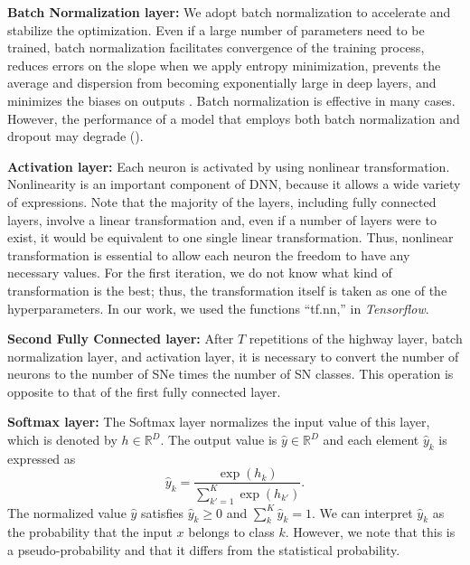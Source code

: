 \documentclass[useamsfonts]{pasj01}
\begin{document}
{\bf Batch Normalization layer:}
We adopt batch normalization \citep{batch_norm} to accelerate and stabilize the optimization. 
Even if a large number of parameters need to be trained, batch normalization facilitates convergence of the training process, reduces errors on the slope when we apply entropy minimization, prevents the average and dispersion from becoming exponentially large in deep layers, and minimizes the biases on outputs  \citep{understanding_batch_norm}.
Batch normalization is effective in many cases. 
However, the performance of a model that employs both batch normalization and dropout may degrade  (\cite{dropout_and_batch_norm}).   

{\bf Activation layer:}
Each neuron is activated by using nonlinear transformation. 
Nonlinearity is an important component of DNN, because it allows a wide variety of expressions. 
Note that the majority of the layers, including fully connected layers, involve a linear transformation and, even if a number of layers were to exist, it would be equivalent to one single linear transformation. 
Thus, nonlinear transformation is essential to allow each neuron the freedom to have any necessary values.
For the first iteration, we do not know what kind of transformation is the best; thus, the transformation itself is taken as one of the hyperparameters. 
In our work, we used the functions ``tf.nn,'' in {\it Tensorflow}.

{\bf Second Fully Connected layer:}
After $T$ repetitions of the highway layer, batch normalization layer, and activation layer, it is necessary to convert the number of neurons to the number of SNe times the number of SN classes. 
This operation is opposite to that of the first fully connected layer.

{\bf Softmax layer:}
The Softmax layer normalizes the input value of this layer, which is denoted by $h \in \mathbb{R}^D$. The output value is $\hat{y} \in \mathbb{R}^D$ and each element $\hat{y}_k$ is expressed as
\begin{equation}
    \hat{y}_k = \frac{\exp \left( h_k \right)}{\sum_{k'=1}^K \exp \left( h_{k'} \right)}.
\end{equation}
The normalized value $\hat{y}$ satisfies $\hat{y}_k \geq 0$ and $\sum_k^K \hat{y}_k =1$.
We can interpret $\hat{y}_k$ as the probability that the input $x$ belongs to class $k$.
However, we note that this is a pseudo-probability and that it differs from the statistical probability.
  
\end{document}
